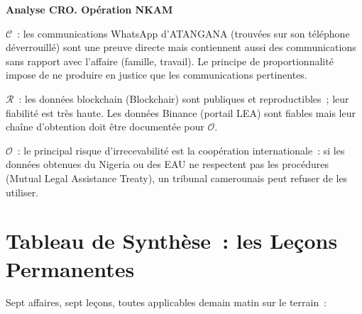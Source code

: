 \begin{boxCRO}
\textbf{Analyse CRO. Opération NKAM}

$\mathcal{C}$~: les communications WhatsApp d'ATANGANA (trouvées sur
son téléphone déverrouillé) sont une preuve directe mais contiennent
aussi des communications sans rapport avec l'affaire (famille, travail).
Le principe de proportionnalité impose de ne produire en justice que
les communications pertinentes.

$\mathcal{R}$~: les données blockchain (Blockchair) sont publiques et
reproductibles~; leur fiabilité est très haute. Les données Binance
(portail LEA) sont fiables mais leur chaîne d'obtention doit être
documentée pour $\mathcal{O}$.

$\mathcal{O}$~: le principal risque d'irrecevabilité est la coopération
internationale~: si les données obtenues du Nigeria ou des EAU ne
respectent pas les procédures  (Mutual Legal Assistance
Treaty), un tribunal camerounais peut refuser de les utiliser.

\end{boxCRO}

\section{Tableau de Synthèse~: les Leçons Permanentes}
\label{sec:synthese-affaires}

Sept affaires, sept leçons, toutes applicables demain matin sur le terrain~:

